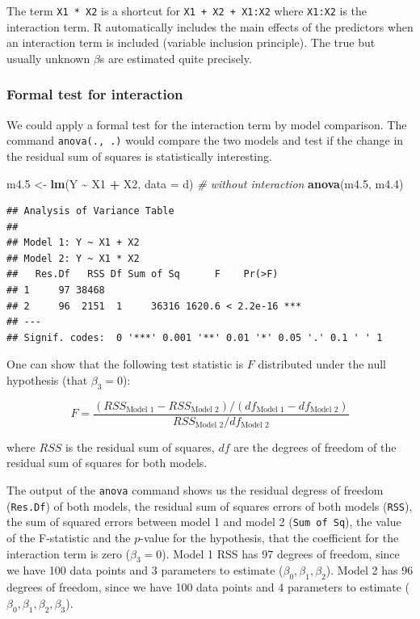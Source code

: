 \documentclass[
]{book}
\newenvironment{Shaded}{\begin{snugshade}}{\end{snugshade}}
\newcommand{\AttributeTok}[1]{\textcolor[rgb]{0.13,0.29,0.53}{#1}}
\newcommand{\CommentTok}[1]{\textcolor[rgb]{0.56,0.35,0.01}{\textit{#1}}}
\newcommand{\FloatTok}[1]{\textcolor[rgb]{0.00,0.00,0.81}{#1}}
\newcommand{\FunctionTok}[1]{\textcolor[rgb]{0.13,0.29,0.53}{\textbf{#1}}}
\newcommand{\NormalTok}[1]{#1}
\newcommand{\OtherTok}[1]{\textcolor[rgb]{0.56,0.35,0.01}{#1}}
\newcommand{\SpecialCharTok}[1]{\textcolor[rgb]{0.81,0.36,0.00}{\textbf{#1}}}
\begin{document}
The term \texttt{X1\ *\ X2} is a shortcut for \texttt{X1\ +\ X2\ +\ X1:X2} where \texttt{X1:X2} is the interaction term.
R automatically includes the main effects of the predictors when an interaction
term is included (variable inclusion principle).
The true but usually unknown \(\beta\)s are estimated quite precisely.

\subsubsection{Formal test for interaction}\label{formal-test-for-interaction}

We could apply a formal test for the interaction term by model comparison.
The command \texttt{anova(.,\ .)} would compare the two models and test if the change in the
residual sum of squares is statistically interesting.

\begin{Shaded}
\begin{Highlighting}[]
\NormalTok{m4}\FloatTok{.5} \OtherTok{\textless{}{-}} \FunctionTok{lm}\NormalTok{(Y }\SpecialCharTok{\textasciitilde{}}\NormalTok{ X1 }\SpecialCharTok{+}\NormalTok{ X2, }\AttributeTok{data =}\NormalTok{ d) }\CommentTok{\# without interaction}
\FunctionTok{anova}\NormalTok{(m4}\FloatTok{.5}\NormalTok{, m4}\FloatTok{.4}\NormalTok{)}
\end{Highlighting}
\end{Shaded}

\begin{verbatim}
## Analysis of Variance Table
## 
## Model 1: Y ~ X1 + X2
## Model 2: Y ~ X1 * X2
##   Res.Df   RSS Df Sum of Sq      F    Pr(>F)    
## 1     97 38468                                  
## 2     96  2151  1     36316 1620.6 < 2.2e-16 ***
## ---
## Signif. codes:  0 '***' 0.001 '**' 0.01 '*' 0.05 '.' 0.1 ' ' 1
\end{verbatim}

One can show that the following test statistic is \(F\) distributed under the null hypothesis (that \(\beta_3=0\)):

\[ F = \frac{\left(RSS_{\text{Model 1}} - RSS_{\text{Model 2}}\right) / \left(df_{\text{Model 1}} - df_{\text{Model 2}}\right)}{RSS_{\text{Model 2}} / df_{\text{Model 2}}}\]

where \(RSS\) is the residual sum of squares,
\(df\) are the degrees of freedom of the residual sum of squares for both models.

The output of the \texttt{anova} command shows us the residual degress of freedom (\texttt{Res.Df})
of both models, the residual sum of squares errors of both models (\texttt{RSS}),
the sum of squared errors between model 1 and model 2 (\texttt{Sum\ of\ Sq}), the value of the
F-statistic and the \(p\)-value for the hypothesis, that the coefficient for
the interaction term is zero (\(\beta_3=0\)). Model 1 RSS has 97 degrees of freedom, since we have 100 data points
and 3 parameters to estimate (\(\beta_0, \beta_1, \beta_2\)). Model 2 has 96 degrees of freedom, since
we have 100 data points and 4 parameters to estimate (\(\beta_0, \beta_1, \beta_2, \beta_3\)).
\end{document}
